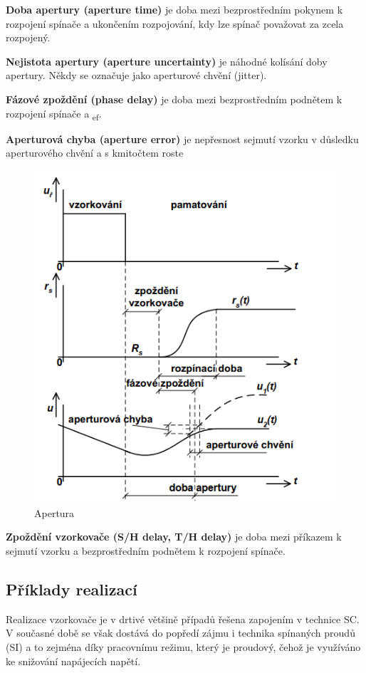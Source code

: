 \textbf{Doba apertury (aperture time)} je doba mezi bezprostředním pokynem k rozpojení
spínače a ukončením rozpojování, kdy lze spínač považovat za zcela rozpojený.

\textbf{Nejistota apertury (aperture uncertainty)} je náhodné kolísání doby apertury. Někdy se
označuje jako aperturové chvění (jitter).

\textbf{Fázové zpoždění (phase delay)} je doba mezi bezprostředním podnětem k rozpojení
spínače a \textsubscript{ef}.

\textbf{Aperturová chyba (aperture error)} je nepřesnost sejmutí vzorku v důsledku aperturového
chvění a s kmitočtem roste
   \begin{figure}[h]
   \begin{center}
     \includegraphics[scale=0.6]{images/Apertura.png}
   \end{center}
   \caption{Apertura}
  \end{figure}
  
\textbf{Zpoždění vzorkovače (S/H delay, T/H delay)} je doba mezi příkazem k sejmutí vzorku a bezprostředním podnětem k rozpojení spínače.

\subsection{Příklady realizací}
Realizace vzorkovače je v drtivé většině případů řešena zapojením v technice SC. V současné době se však dostává do popředí zájmu i technika spínaných proudů (SI) a to zejména díky pracovnímu režimu, který je proudový, čehož je využíváno ke snižování napájecích napětí.

